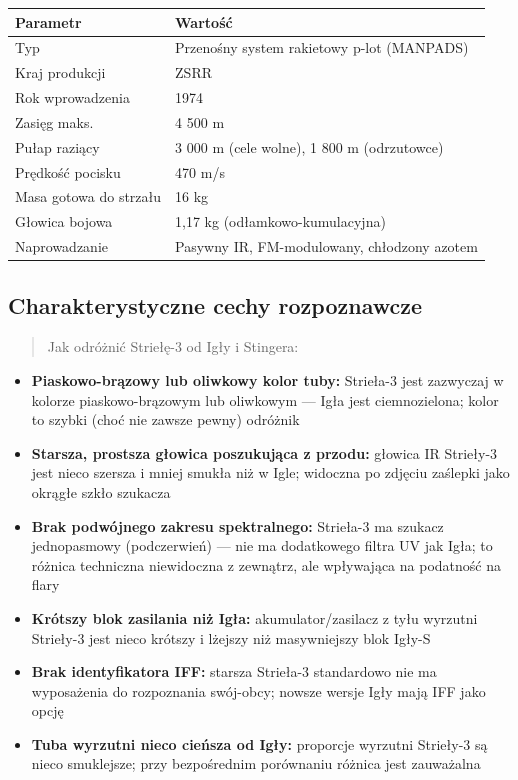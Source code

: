 \documentclass[12pt,oneside]{book}
\providecommand{\tightlist}{%
  \setlength{\itemsep}{0pt}\setlength{\parskip}{0pt}}
\begin{document}
\begin{longtable}[]{@{}ll@{}}
\toprule\noalign{}
Parametr & Wartość \\
\midrule\noalign{}
\endhead
\bottomrule\noalign{}
\endlastfoot
Typ & Przenośny system rakietowy p-lot (MANPADS) \\
Kraj produkcji & ZSRR \\
Rok wprowadzenia & 1974 \\
Zasięg maks. & 4 500 m \\
Pułap raziący & 3 000 m (cele wolne), 1 800 m (odrzutowce) \\
Prędkość pocisku & 470 m/s \\
Masa gotowa do strzału & 16 kg \\
Głowica bojowa & 1,17 kg (odłamkowo-kumulacyjna) \\
Naprowadzanie & Pasywny IR, FM-modulowany, chłodzony azotem \\
\end{longtable}

\subsection{Charakterystyczne cechy
rozpoznawcze}\label{charakterystyczne-cechy-rozpoznawcze-46}

\begin{quote}
Jak odróżnić Striełę-3 od Igły i Stingera:
\end{quote}

\begin{itemize}
\tightlist
\item
  \textbf{Piaskowo-brązowy lub oliwkowy kolor tuby:} Strieła-3 jest
  zazwyczaj w kolorze piaskowo-brązowym lub oliwkowym --- Igła jest
  ciemnozielona; kolor to szybki (choć nie zawsze pewny) odróżnik
\item
  \textbf{Starsza, prostsza głowica poszukująca z przodu:} głowica IR
  Strieły-3 jest nieco szersza i mniej smukła niż w Igle; widoczna po
  zdjęciu zaślepki jako okrągłe szkło szukacza
\item
  \textbf{Brak podwójnego zakresu spektralnego:} Strieła-3 ma szukacz
  jednopasmowy (podczerwień) --- nie ma dodatkowego filtra UV jak Igła;
  to różnica techniczna niewidoczna z zewnątrz, ale wpływająca na
  podatność na flary
\item
  \textbf{Krótszy blok zasilania niż Igła:} akumulator/zasilacz z tyłu
  wyrzutni Strieły-3 jest nieco krótszy i lżejszy niż masywniejszy blok
  Igły-S
\item
  \textbf{Brak identyfikatora IFF:} starsza Strieła-3 standardowo nie ma
  wyposażenia do rozpoznania swój-obcy; nowsze wersje Igły mają IFF jako
  opcję
\item
  \textbf{Tuba wyrzutni nieco cieńsza od Igły:} proporcje wyrzutni
  Strieły-3 są nieco smuklejsze; przy bezpośrednim porównaniu różnica
  jest zauważalna
\end{itemize}
\end{document}
